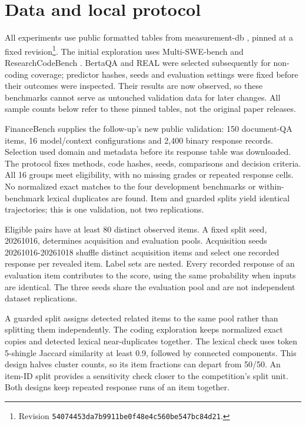 \documentclass{article}
\begin{document}
\section{Data and local protocol}\label{data-and-local-protocol}

All experiments use public formatted tables from measurement-db \cite{ref3}, pinned at a fixed revision\footnote{Revision \texttt{54074453da7b9911be0f48e4c560be547bc84d21}.}. The initial exploration uses Multi-SWE-bench \cite{ref5} and ResearchCodeBench \cite{ref6}. BertaQA \cite{ref7} and REAL \cite{ref8} were selected subsequently for non-coding coverage; predictor hashes, seeds and evaluation settings were fixed before their outcomes were inspected. Their results are now observed, so these benchmarks cannot serve as untouched validation data for later changes. All sample counts below refer to these pinned tables, not the original paper releases.

FinanceBench \cite{ref9} supplies the follow-up's new public validation: 150 document-QA items, 16 model/context configurations and 2,400 binary response records. Selection used domain and metadata before its response table was downloaded. The protocol fixes methods, code hashes, seeds, comparisons and decision criteria. All 16 groups meet eligibility, with no missing grades or repeated response cells. No normalized exact matches to the four development benchmarks or within-benchmark lexical duplicates are found. Item and guarded splits yield identical trajectories; this is one validation, not two replications.

Eligible pairs have at least 80 distinct observed items. A fixed split seed, 20261016, determines acquisition and evaluation pools. Acquisition seeds 20261016-20261018 shuffle distinct acquisition items and select one recorded response per revealed item. Label sets are nested. Every recorded response of an evaluation item contributes to the score, using the same probability when inputs are identical. The three seeds share the evaluation pool and are not independent dataset replications.

A guarded split assigns detected related items to the same pool rather than splitting them independently. The coding exploration keeps normalized exact copies and detected lexical near-duplicates together. The lexical check uses token 5-shingle Jaccard similarity at least 0.9, followed by connected components. This design halves cluster counts, so its item fractions can depart from 50/50. An item-ID split provides a sensitivity check closer to the competition's split unit. Both designs keep repeated response runs of an item together.
\end{document}
